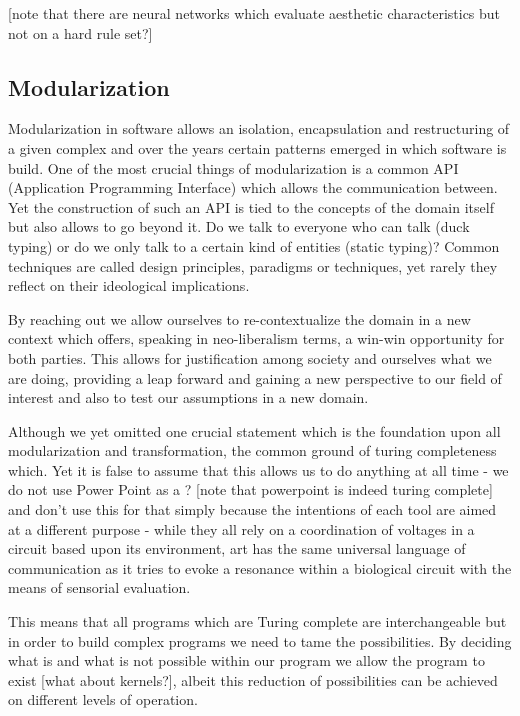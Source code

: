 \documentclass[10pt,twocolumn,letterpaper]{article}
\begin{document}
[note that there are neural networks which evaluate aesthetic characteristics but not on a hard rule set?]

\subsection{Modularization}

Modularization in software allows an isolation, encapsulation and restructuring of a given complex and over the years certain patterns emerged in which software is build.
One of the most crucial things of modularization is a common API (Application Programming Interface) which allows the communication between.
Yet the construction of such an API is tied to the concepts of the domain itself but also allows to go beyond it.
Do we talk to everyone who can talk (duck typing) or do we only talk to a certain kind of entities (static typing)?
Common techniques are called design principles, paradigms or techniques, yet rarely they reflect on their ideological implications.

By reaching out we allow ourselves to re-contextualize the domain in a new context which offers, speaking in neo-liberalism terms, a win-win opportunity for both parties.
This allows for justification among society and ourselves what we are doing, providing a leap forward and gaining a new perspective to our field of interest and also to test our assumptions in a new domain.

Although we yet omitted one crucial statement which is the foundation upon all modularization and transformation, the common ground of turing completeness which.
Yet it is false to assume that this allows us to do anything at all time - we do not use Power Point as a ? [note that powerpoint is indeed turing complete] and don't use this for that simply because the intentions of each tool are aimed at a different purpose  - while they all rely on a coordination of voltages in a circuit based upon its environment, art has the same universal language of communication as it tries to evoke a resonance within a biological circuit with the means of sensorial evaluation.

This means that all programs which are Turing complete are interchangeable but in order to build complex programs we need to tame the possibilities.
By deciding what is and what is not possible within our program we allow the program to exist [what about kernels?], albeit this reduction of possibilities can be achieved on different levels of operation.
\end{document}
